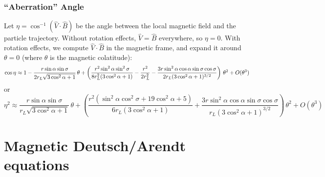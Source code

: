 \documentclass{article}
\begin{document}
\subsubsection{``Aberration'' Angle}

Let $\eta = \cos^{-1}(\hat{V}\cdot\hat{B})$ be the angle between the local magnetic field and the particle trajectory.
Without rotation effects, $\hat{V} = \hat{B}$ everywhere, so $\eta = 0$.
With rotation effects, we compute $\hat{V}\cdot\hat{B}$ in the magnetic frame, and expand it around $\theta = 0$ (where $\theta$ is the magnetic colatitude):
\begin{equation}
    \cos\eta \approx 1 - \frac{r\sin\alpha\sin\sigma}{2r_L\sqrt{3\cos^2\alpha+1}}\,\theta +
        \left(\frac{r^2\sin^2\alpha\sin^2\sigma}{8r_L^2(3\cos^2\alpha+1)} -
              \frac{r^2}{2r_L^2} -
              \frac{3r\sin^2\alpha\cos\alpha\sin\sigma\cos\sigma}{2r_L(3\cos^2\alpha+1)^{3/2}}\right)\,\theta^2 + O(\theta^3) \\
\end{equation}
or
\begin{equation}
    \eta^2 \approx \frac{r\sin\alpha\sin\sigma}{r_L\sqrt{3\cos^2\alpha+1}}\,\theta +
        \left(\frac{r^2(\sin^2\alpha\cos^2\sigma + 19\cos^2\alpha + 5)}{6r_L(3\cos^2\alpha + 1)} +
              \frac{3r\sin^2\alpha\cos\alpha\sin\sigma\cos\sigma}{r_L(3\cos^2\alpha+1)^{3/2}}\right)\,\theta^2 + O(\theta^3)
\end{equation}

\section{Magnetic Deutsch/Arendt equations}
\end{document}
